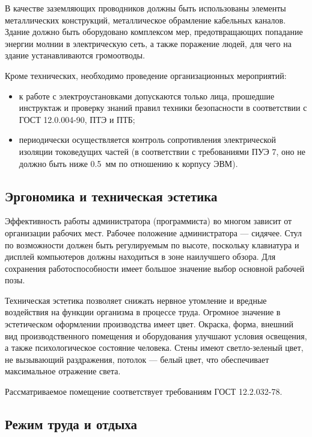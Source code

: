 В качестве заземляющих проводников должны быть использованы элементы металлических конструкций, металлическое обрамление кабельных каналов.
Здание должно быть оборудовано комплексом мер, предотвращающих попадание энергии молнии в электрическую сеть, а также поражение людей, для чего на здание устанавливаются громоотводы.

Кроме технических, необходимо проведение организационных мероприятий:
\begin{itemize}
  \item к работе с электроустановками допускаются только лица, прошедшие инструктаж и проверку знаний правил техники безопасности в соответствии с ГОСТ 12.0.004-90, ПТЭ и ПТБ;
  \item периодически осуществляется контроль сопротивления электрической изоляции токоведущих частей (в соответствии с требованиями ПУЭ 7, оно не должно быть ниже 0.5~мм по отношению к корпусу ЭВМ).
\end{itemize}

\subsection{Эргономика и техническая эстетика}

Эффективность работы администратора (программиста) во многом зависит от организации рабочих мест.
Рабочее положение администратора --- сидячее.
Стул по возможности должен быть регулируемым по высоте, поскольку клавиатура и дисплей компьютеров должны находиться в зоне наилучшего обзора.
Для сохранения работоспособности имеет большое значение выбор основной рабочей позы.

Техническая эстетика позволяет снижать нервное утомление и вредные воздействия на функции организма в процессе труда.
Огромное значение в эстетическом оформлении производства имеет цвет.
Окраска, форма, внешний вид производственного помещения и оборудования улучшают условия освещения, а также психологическое состояние человека. Стены имеют светло-зеленый цвет, не вызывающий раздражения, потолок --- белый цвет, что обеспечивает максимальное отражение света.

Рассматриваемое помещение соответствует требованиям ГОСТ 12.2.032-78.
    	
\subsection{Режим труда и отдыха}

